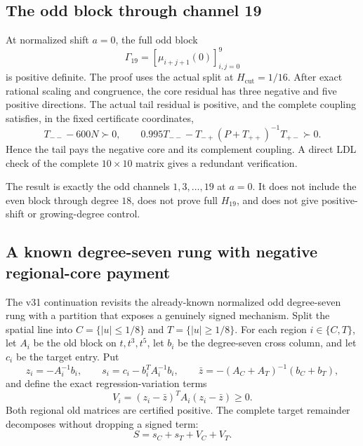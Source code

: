 \documentclass[11pt]{article}
\theoremstyle{definition}
\theoremstyle{remark}
\newcommand{\pd}{\succ 0}
\begin{document}
\subsection{The odd block through channel 19}

At normalized shift $a=0$, the full odd block
\begin{equation}
 \Gamma_{19}=[\mu_{i+j+1}(0)]_{i,j=0}^{9}
\end{equation}
is positive definite. The proof uses the actual split at
$H_{\mathrm{cut}}=1/16$. After exact
rational scaling and congruence, the core residual has three negative and five
positive directions. The actual tail residual is positive, and the complete
coupling satisfies, in the fixed certificate coordinates,
\begin{equation}
  T_{--}-600N\pd,
  \qquad 0.995T_{--}-T_{-+}(P+T_{++})^{-1}T_{+-}\pd.
\end{equation}
Hence the tail pays the negative core and its complement coupling. A direct
LDL check of the complete $10\times10$ matrix gives a redundant verification.

The result is exactly the odd channels $1,3,\ldots,19$ at $a=0$. It does not
include the even block through degree $18$, does not prove full $H_{19}$, and
does not give positive-shift or growing-degree control.

\subsection{A known degree-seven rung with negative regional-core payment}

The v31 continuation revisits the already-known normalized odd degree-seven
rung with a partition that exposes a genuinely signed mechanism. Split the
spatial line into $C=\{|u|\le1/8\}$ and $T=\{|u|\ge1/8\}$. For each region
$i\in\{C,T\}$, let $A_i$ be the old block on $t,t^3,t^5$, let $b_i$ be the
degree-seven cross column, and let $c_i$ be the target entry. Put
\begin{equation}
 z_i=-A_i^{-1}b_i,
 \qquad s_i=c_i-b_i^TA_i^{-1}b_i,
 \qquad
 \bar z=-(A_C+A_T)^{-1}(b_C+b_T),
\end{equation}
and define the exact regression-variation terms
\begin{equation}
 V_i=(z_i-\bar z)^TA_i(z_i-\bar z)\ge0.
\end{equation}
Both regional old matrices are certified positive. The complete target
remainder decomposes without dropping a signed term:
\begin{equation}
 S=s_C+s_T+V_C+V_T.
 \label{eq:degree7-regional-decomposition}
\end{equation}
\end{document}

